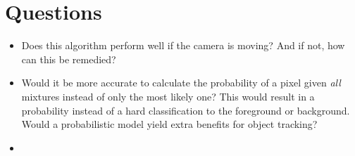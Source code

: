 \documentclass{article}
\begin{document}
\section{Questions}
	\begin{itemize}
		\item Does this algorithm perform well if the camera is moving? And if
			not, how can this be remedied?
		\item Would it be more accurate to calculate the probability of a pixel
			given \emph{all} mixtures instead of only the most likely one? This
			would result in a probability instead of a hard classification to
			the foreground or background. Would a probabilistic model yield
			extra benefits for object tracking?
		\item
	\end{itemize}
\end{document}
